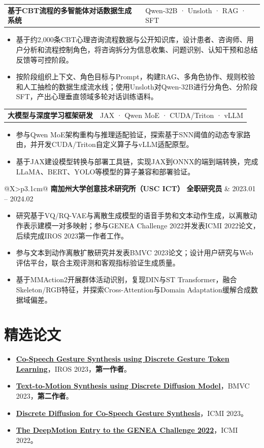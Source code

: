 \documentclass[UTF8,fontset=fandol,10pt,a4paper]{ctexart}
\makeatletter
\newcommand{\daterange}[1]{\textcolor{secondary}{\small #1}}
\newcommand{\companyentry}[4]{%
  \begin{tabularx}{\textwidth}{@{}X>{\raggedleft\arraybackslash}p{3.1cm}@{}}
    \textbf{#1} \quad \textbf{#2} & \daterange{#3} \\
    \multicolumn{2}{@{}l@{}}{\textcolor{secondary}{\small #4}}
  \end{tabularx}
}
\newcommand{\projecttitle}[2]{%
  \vspace{0.18em}%
  \begin{tabularx}{\textwidth}{@{}X>{\raggedleft\arraybackslash}p{7.2cm}@{}}
    \textbf{#1} & \textcolor{secondary}{\small #2}
  \end{tabularx}
}
\makeatother
\begin{document}
\projecttitle{基于CBT流程的多智能体对话数据生成系统}{Qwen-32B · Unsloth · RAG · SFT}
\begin{itemize}
  \item 基于约2,000条CBT心理咨询流程数据与公开知识库，设计患者、咨询师、用户分析和流程控制角色，将咨询拆分为信息收集、问题识别、认知干预和总结反馈等可控阶段。
  \item 按阶段组织上下文、角色目标与Prompt，构建RAG、多角色协作、规则校验和人工抽检的数据生成流水线；使用Unsloth对Qwen-32B进行分角色、分阶段SFT，产出心理垂直领域多轮对话训练语料。
\end{itemize}

\projecttitle{大模型与深度学习框架研发}{JAX · Qwen MoE · CUDA/Triton · vLLM}
\begin{itemize}
  \item 参与Qwen MoE架构重构与推理适配验证，探索基于SNN阈值的动态专家路由，并开发CUDA/Triton自定义算子与vLLM适配原型。
  \item 基于JAX建设模型转换与部署工具链，实现JAX到ONNX的端到端转换，完成LLaMA、BERT、YOLO等模型的算子兼容和部署验证。
\end{itemize}

\vspace{0.25em}
\companyentry
  {南加州大学创意技术研究所（USC ICT）}
  {全职研究员}
  {2023.01 -- 2024.02}
  {生成模型、人体动作生成与视频理解}

\begin{itemize}
  \item 研究基于VQ/RQ-VAE与离散生成模型的语音手势和文本动作生成，以离散动作表示建模一对多映射；参与GENEA Challenge 2022并发表ICMI 2022论文，后续完成IROS 2023第一作者工作。
  \item 参与文本到动作离散扩散研究并发表BMVC 2023论文；设计用户研究与Web评估平台，联合主观评测和客观指标验证生成质量。
  \item 基于MMAction2开展群体活动识别，复现DIN与ST Transformer，融合Skeleton/RGB特征，并探索Cross-Attention与Domain Adaptation缓解合成数据域偏差。
\end{itemize}

\section{精选论文}

\begin{itemize}
  \item \href{https://doi.org/10.48550/arXiv.2303.12822}{\textbf{Co-Speech Gesture Synthesis using Discrete Gesture Token Learning}}，IROS 2023，\textbf{第一作者}。
  \item \href{https://proceedings.bmvc2023.org/624/}{\textbf{Text-to-Motion Synthesis using Discrete Diffusion Model}}，BMVC 2023，\textbf{第二作者}。
  \item \href{https://doi.org/10.1145/3610661.3616556}{\textbf{Discrete Diffusion for Co-Speech Gesture Synthesis}}，ICMI 2023。
  \item \href{https://doi.org/10.1145/3536221.3558059}{\textbf{The DeepMotion Entry to the GENEA Challenge 2022}}，ICMI 2022。
\end{itemize}
\end{document}
